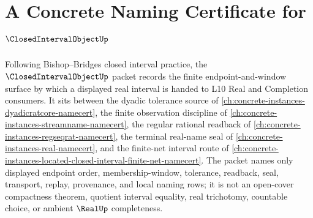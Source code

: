\chapter{A Concrete Naming Certificate for $\ClosedIntervalObjectUp$}
\label{ch:concrete-instances-closed-interval-object-namecert}

Following Bishop--Bridges closed interval practice, the $\ClosedIntervalObjectUp$ packet records the finite endpoint-and-window surface by which a displayed real interval is handed to L10 Real and Completion consumers. It sits between the dyadic tolerance source of \autoref{ch:concrete-instances-dyadicratcore-namecert}, the finite observation discipline of \autoref{ch:concrete-instances-streamname-namecert}, the regular rational readback of \autoref{ch:concrete-instances-regseqrat-namecert}, the terminal real-name seal of \autoref{ch:concrete-instances-real-namecert}, and the finite-net interval route of \autoref{ch:concrete-instances-located-closed-interval-finite-net-namecert}. The packet names only displayed endpoint order, membership-window, tolerance, readback, seal, transport, replay, provenance, and local naming rows; it is not an open-cover compactness theorem, quotient interval equality, real trichotomy, countable choice, or ambient $\RealUp$ completeness.

